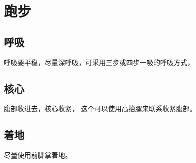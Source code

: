 
\chapter{跑步}

\section{呼吸}

呼吸要平稳，尽量深呼吸，可采用三步或四步一吸的呼吸方式，

\section{核心}

腹部收进去，核心收紧，
这个可以使用高抬腿来联系收紧腹部。


\section{着地}

尽量使用前脚掌着地。







